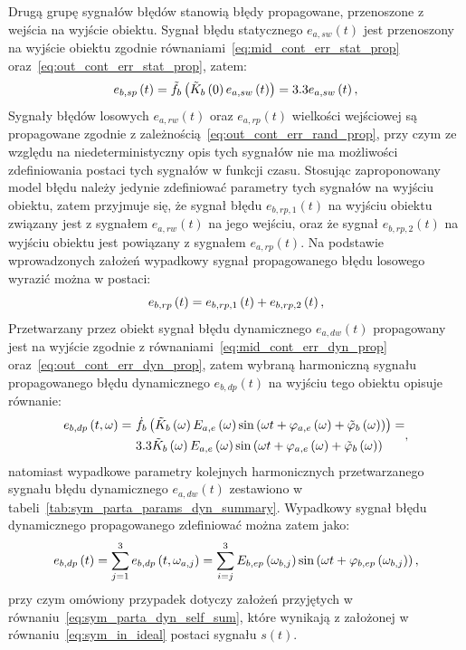 Drugą grupę sygnałów błędów stanowią błędy propagowane, przenoszone z wejścia na wyjście obiektu. Sygnał błędu statycznego $e_{a,sw}(t)$ jest przenoszony na wyjście obiektu zgodnie równaniami~\eqref{eq:mid_cont_err_stat_prop} oraz~\eqref{eq:out_cont_err_stat_prop}, zatem:
\begin{equation}
e_{b,sp} \left(t\right) = \tilde{f}_{b} \left( \tilde{K}_{b} \left(0\right) e_{a,sw} \left(t\right) \right) = 3.3 e_{a,sw} \left(t\right) \label{eq:sym_partb_stat_prop_err},
\end{equation}
Sygnały błędów losowych $e_{a,rw}(t)$ oraz $e_{a,rp}(t)$ wielkości wejściowej są propagowane zgodnie z zależnością~\eqref{eq:out_cont_err_rand_prop}, przy czym ze względu na niedeterministyczny opis tych sygnałów nie ma możliwości zdefiniowania postaci tych sygnałów w funkcji czasu. Stosując zaproponowany model błędu należy jedynie zdefiniować parametry tych sygnałów na wyjściu obiektu, zatem przyjmuje się, że sygnał błędu $e_{b,rp,1}(t)$ na wyjściu obiektu związany jest z sygnałem $e_{a,rw}(t)$ na jego wejściu, oraz że sygnał $e_{b,rp,2}(t)$ na wyjściu obiektu jest powiązany z sygnałem $e_{a,rp}(t)$. Na podstawie wprowadzonych założeń wypadkowy sygnał propagowanego błędu losowego wyrazić można w postaci:
\begin{equation}
e_{b,rp} \left(t\right) = e_{b,rp,1} \left(t\right) + e_{b,rp,2} \left(t\right) \label{eq:sym_partb_rand_prop_err},
\end{equation}
Przetwarzany przez obiekt sygnał błędu dynamicznego $e_{a,dw}(t)$ propagowany jest na wyjście zgodnie z równaniami~\eqref{eq:mid_cont_err_dyn_prop} oraz~\eqref{eq:out_cont_err_dyn_prop}, zatem wybraną harmoniczną sygnału propagowanego błędu dynamicznego $e_{b,dp}(t)$ na wyjściu tego obiektu opisuje równanie:
\begin{equation}
\begin{split}
e_{b,dp} \left(t,\omega\right) =~
& \dot{f}_{b} \left( \tilde{K}_{b} \left(\omega\right) E_{a,e} \left(\omega\right) \sin \left( \omega t + \varphi_{a,e} \left(\omega\right) + \tilde{\varphi}_{b} \left(\omega\right) \right) \right) = \\
& 3.3 \tilde{K}_{b} \left(\omega\right) E_{a,e} \left(\omega\right) \sin \left( \omega t + \varphi_{a,e} \left(\omega\right) + \tilde{\varphi}_{b} \left(\omega\right) \right)
\end{split}
\label{eq:sym_partb_dyn_prop_err},
\end{equation}
natomiast wypadkowe parametry kolejnych harmonicznych przetwarzanego sygnału błędu dynamicznego $e_{a,dw}(t)$ zestawiono w tabeli~\ref{tab:sym_parta_params_dyn_summary}. Wypadkowy sygnał błędu dynamicznego propagowanego zdefiniować można zatem jako:
\begin{equation}
e_{b,dp} \left(t\right) = \sum _{j = 1} ^{3} e_{b,dp} \left(t,\omega_{a,j}\right) = \sum _{i = j} ^{3} E_{b,ep} \left(\omega_{b,j}\right) \sin \left(\omega t + \varphi_{b,ep} \left(\omega_{b,j}\right)\right) \label{eq:sym_partb_dyn_prop_sum},
\end{equation}
przy czym omówiony przypadek dotyczy założeń przyjętych w równaniu~\eqref{eq:sym_parta_dyn_self_sum}, które wynikają z założonej w równaniu~\eqref{eq:sym_in_ideal} postaci sygnału $s(t)$.

